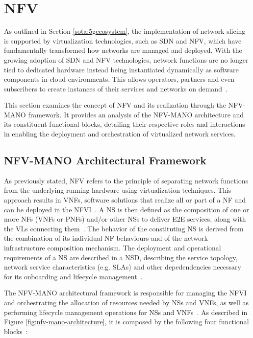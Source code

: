 \section{NFV} \label{sota:nfv}

As outlined in Section \ref{sota:5gecosystem}, the implementation of network slicing is supported by virtualization technologies, such as \acs{SDN} and \acs{NFV}, which have fundamentally transformed how networks are managed and deployed. With the growing adoption of \acs{SDN} and \acs{NFV} technologies, network functions are no longer tied to dedicated hardware instead being instantiated dynamically as software components in cloud environments. This allows operators, partners and even subscribers to create instances of their services and networks on demand~\cite{EricsonOSS}. 

This section examines the concept of \acs{NFV} and its realization through the \acf{NFV-MANO} framework. It provides an analysis of the \acs{NFV-MANO} architecture and its constituent functional blocks, detailing their respective roles and interactions in enabling the deployment and orchestration of virtualized network services.


\subsection{NFV-MANO Architectural Framework}

As previously stated, \acs{NFV} refers to the principle of separating network functions from the underlying running hardware using virtualization techniques. This approach results in \acfp{VNF}, software solutions that realize all or part of a \acf{NF} and can be deployed in the \acf{NFVI}~\cite{ETSI_GR_NFV_TERMINOLOGY_003_V1_9_1}. A \acf{NS} is then defined as the composition of one or more \acsp{NF} (\acsp{VNF} or \acsp{PNF}) and/or other \acsp{NS} to deliver \acs{E2E} services, along with the \acfp{VL} connecting them~\cite{ETSI_GS_NFV_006_V5_2_1}. The behavior of the constituting \acs{NS} is derived from the combination of its individual \acs{NF} behaviours and of the network infrastructure composition mechanism. The deployment and operational requirements of a \acs{NS} are described in a \acf{NSD}, describing the service topology, network service characteristics (e.g. \acsp{SLA}) and other depedendencies necessary for its onboarding and lifecycle management~\citep{ETSI_GS_NFV_MAN_001_V1_1_1,ETSI_GR_NFV_TERMINOLOGY_003_V1_9_1}.

The \acs{NFV-MANO} architectural framework is responsible for managing the \acs{NFVI} and orchestrating the allocation of resources needed by \acsp{NS} and \acsp{VNF}, as well as performing lifecycle management operations for \acsp{NS} and \acsp{VNF}~\citep{ETSI_GS_NFV_MAN_001_V1_1_1,ETSI_GS_NFV_006_V5_2_1}. As described in Figure \ref{fig:nfv-mano-architecture}, it is composed by the following four functional blocks~\cite{ETSI_GS_NFV_006_V5_2_1}:

